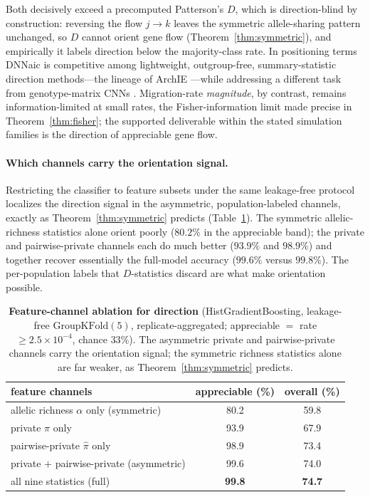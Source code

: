 \documentclass[11pt]{article}
\theoremstyle{plain}
\theoremstyle{definition}
\theoremstyle{remark}
\begin{document}
Both decisively exceed a precomputed Patterson's $D$, which is direction-blind by construction:
reversing the flow $j\!\to\!k$ leaves the symmetric allele-sharing pattern unchanged, so $D$ cannot
orient gene flow (Theorem~\ref{thm:symmetric}), and empirically it labels direction below the
majority-class rate. In positioning terms DNNaic is competitive among lightweight, outgroup-free,
summary-statistic direction methods---the lineage of ArchIE \citep{durvasula2019archie}---while
addressing a different task from genotype-matrix CNNs \citep{gower2021genomatnn,ray2024introunet}.
Migration-rate \emph{magnitude}, by contrast, remains information-limited at small rates, the
Fisher-information limit made precise in Theorem~\ref{thm:fisher}; the supported deliverable within
the stated simulation families is the direction of appreciable gene flow.

\paragraph{Which channels carry the orientation signal.} Restricting the classifier to feature
subsets under the same leakage-free protocol localizes the direction signal in the asymmetric,
population-labeled channels, exactly as Theorem~\ref{thm:symmetric} predicts
(Table~\ref{tab:channels}). The symmetric allelic-richness statistics alone orient poorly ($80.2\%$
in the appreciable band); the private and pairwise-private channels each do much better ($93.9\%$
and $98.9\%$) and together recover essentially the full-model accuracy ($99.6\%$ versus $99.8\%$).
The per-population labels that $D$-statistics discard are what make orientation possible.

\begin{table}[H]
\centering
\scriptsize
\begin{tabular}{lcc}
\toprule
feature channels & appreciable (\%) & overall (\%) \\
\midrule
allelic richness $\alpha$ only (symmetric) & 80.2 & 59.8 \\
private $\pi$ only & 93.9 & 67.9 \\
pairwise-private $\widehat\pi$ only & 98.9 & 73.4 \\
private $+$ pairwise-private (asymmetric) & 99.6 & 74.0 \\
all nine statistics (full) & \textbf{99.8} & \textbf{74.7} \\
\bottomrule
\end{tabular}
\caption{\textbf{Feature-channel ablation for direction} (HistGradientBoosting, leakage-free
$\mathrm{GroupKFold}(5)$, replicate-aggregated; appreciable $=$ rate $\ge 2.5\times10^{-4}$, chance
$33\%$). The asymmetric private and pairwise-private channels carry the orientation signal; the
symmetric richness statistics alone are far weaker, as Theorem~\ref{thm:symmetric} predicts.}
\label{tab:channels}
\end{table}
\end{document}
